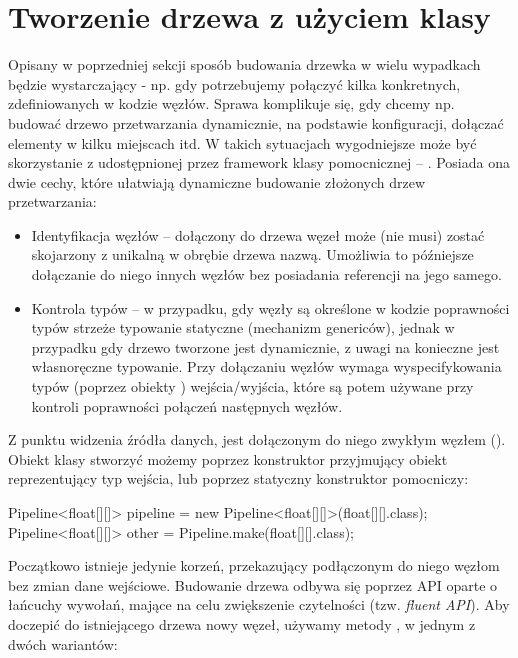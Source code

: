 \section{Tworzenie drzewa z użyciem klasy }
\label{Pipeline}

Opisany w poprzedniej sekcji sposób budowania drzewka w wielu wypadkach będzie wystarczający - np.
gdy potrzebujemy połączyć kilka konkretnych, zdefiniowanych w kodzie węzłów. Sprawa komplikuje się,
gdy chcemy np. budować drzewo przetwarzania dynamicznie, na podstawie konfiguracji, dołączać
elementy w kilku miejscach itd. W takich sytuacjach wygodniejsze może być skorzystanie z
udostępnionej przez framework klasy pomocnicznej -- . Posiada ona dwie cechy, które
ułatwiają dynamiczne budowanie złożonych drzew przetwarzania:

\begin{itemize}
  \item{Identyfikacja węzłów} -- dołączony do drzewa węzeł może (nie musi) zostać skojarzony z
    unikalną w obrębie drzewa nazwą. Umożliwia to późniejsze dołączanie do niego innych węzłów bez
    posiadania referencji na jego samego.

  \item{Kontrola typów} -- w przypadku, gdy węzły są określone w kodzie poprawności typów strzeże
    typowanie statyczne (mechanizm genericów), jednak w przypadku gdy drzewo tworzone jest
    dynamicznie, z uwagi na  konieczne jest własnoręczne typowanie. Przy
    dołączaniu węzłów  wymaga wyspecifykowania typów (poprzez obiekty )
    wejścia/wyjścia, które są potem używane przy kontroli poprawności połączeń następnych węzłów.

\end{itemize}

Z punktu widzenia źródła danych,  jest dołączonym do niego zwykłym węzłem
().  Obiekt klasy  stworzyć możemy poprzez konstruktor przyjmujący
obiekt  reprezentujący typ wejścia, lub poprzez statyczny konstruktor pomocniczy:

\begin{java}
Pipeline<float[][]> pipeline = new Pipeline<float[][]>(float[][].class);
Pipeline<float[][]> other = Pipeline.make(float[][].class);
\end{java}

Początkowo istnieje jedynie korzeń, przekazujący podłączonym do niego węzłom bez zmian dane
wejściowe. Budowanie drzewa odbywa się poprzez API oparte o łańcuchy wywołań, mające na celu
zwiększenie czytelności (tzw. \emph{fluent API}). Aby doczepić do istniejącego drzewa nowy węzeł,
używamy metody , w jednym z dwóch wariantów:

